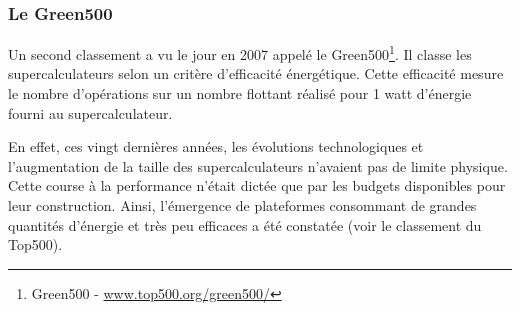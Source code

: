         \begin{table}
\centering
{}
\caption{Classement du Top500 de novembre 2019. Les puissances Rpeak (puissance théorique) et Rmax (puissance mesurée par HPL) sont données en pétaFLOPS ($10^{15}$ FLOPS). L'efficacité est le rapport entre Rmax et Rpeak.}
\label{tab:top500}
\end{table}
   
    \subsubsection{Le Green500}
        
        Un second classement a vu le jour en 2007 appelé le Green500\footnote{Green500 - \url{www.top500.org/green500/}}. Il classe les supercalculateurs selon un critère d'efficacité énergétique. Cette efficacité mesure le nombre d'opérations sur un nombre flottant réalisé pour 1 watt d'énergie fourni au supercalculateur. 
    
        En effet, ces vingt dernières années, les évolutions technologiques et l'augmentation de la taille des supercalculateurs n'avaient pas de limite physique. Cette course à la performance n'était dictée que par les budgets disponibles pour leur construction. Ainsi, l'émergence de plateformes consommant de grandes quantités d'énergie et très peu efficaces a été constatée (voir le classement du Top500). 
        
